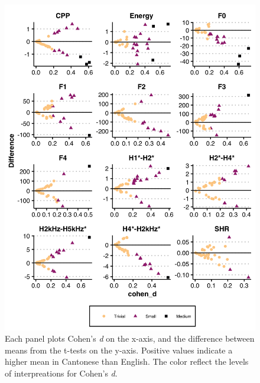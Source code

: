 \begin{figure}[htbp]
    \begin{center}
    \includegraphics[width=\linewidth]{figures/ch3_cohend_part1_5in.png} 
    \caption{Each panel plots Cohen's \textit{d} on the x-axis, and the difference between means from the t-tests on the y-axis. Positive values indicate a higher mean in Cantonese than English. The color reflect the levels of interpreations for Cohen's \textit{d}.}
    \label{ch3:fig:cohendmeasure}
    \end{center}
\end{figure}


